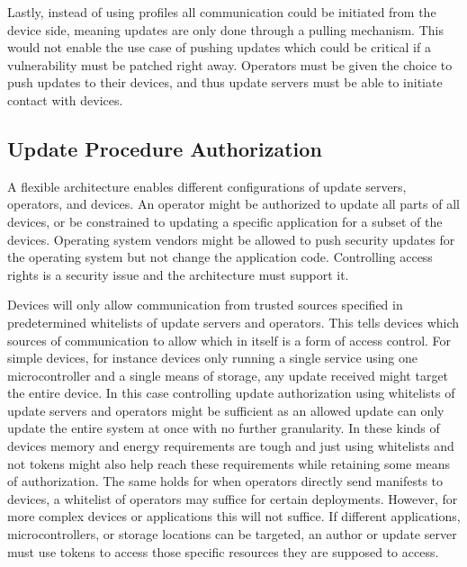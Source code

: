 \documentclass[0-thesis.tex]{subfiles}
\begin{document}
Lastly, instead of using profiles all communication could be initiated from the device
side, meaning updates are only done through a pulling mechanism. This would not enable the
use case of pushing updates which could be critical if a vulnerability must be patched
right away. Operators must be given the choice to push updates to their devices, and thus
update servers must be able to initiate contact with devices.

\subsection{Update Procedure Authorization}
\label{ssec:authorization}
A flexible architecture enables different configurations of update servers, operators, and
devices. An operator might be authorized to update all parts of all devices, or be
constrained to updating a specific application for a subset of the devices. Operating
system vendors might be allowed to push security updates for the operating system but not
change the application code. Controlling access rights is a security issue and the
architecture must support it.

Devices will only allow communication from trusted sources specified in predetermined
whitelists of update servers and operators. This tells devices which sources of
communication to allow which in itself is a form of access control. For simple devices,
for instance devices only running a single service using one microcontroller and a single
means of storage, any update received might target the entire device. In this case
controlling update authorization using whitelists of update servers and operators might be
sufficient as an allowed update can only update the entire system at once with no further
granularity. In these kinds of devices memory and energy requirements are tough and just
using whitelists and not tokens might also help reach these requirements while retaining
some means of authorization. The same holds for when operators directly send manifests to
devices, a whitelist of operators may suffice for certain deployments. However, for more
complex devices or applications this will not suffice. If different applications,
microcontrollers, or storage locations can be targeted, an author or update server must
use tokens to access those specific resources they are supposed to access.
\end{document}

